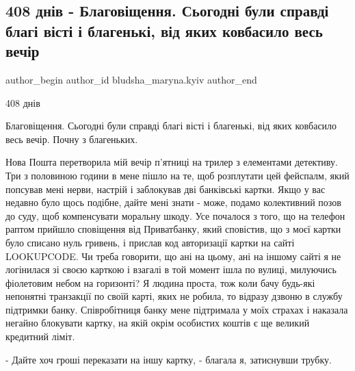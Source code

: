  
 
 
 
 

\subsection{408 днів - Благовіщення. Сьогодні були справді благі вісті і благенькі, від яких ковбасило весь вечір}
\label{sec:08_04_2023.fb.bludsha_maryna.kyiv.1.408_dniv_blagovischennja}

\ifcmt
 author_begin
   author_id bludsha_maryna.kyiv
 author_end
\fi

408 днів

Благовіщення. Сьогодні були справді благі вісті і благенькі, від яких ковбасило
весь вечір. Почну з благеньких.

Нова Пошта перетворила мій вечір п'ятниці на трилер з елементами детективу. Три
з половиною години в мене пішло на те, щоб розплутати цей фейспалм, який
попсував мені нерви, настрій і заблокував дві банківські картки. Якщо у вас
недавно було щось подібне, дайте мені знати - може, подамо колективний позов до
суду, щоб компенсувати моральну шкоду. Усе почалося з того, що на телефон
раптом прийшло сповіщення від Приватбанку, який сповістив, що з моєї картки
було списано нуль гривень, і прислав код авторизації картки на сайті
LOOKUPCODE. Чи треба говорити, що ані на цьому, ані на іншому сайті я не
логінилася зі своєю карткою і взагалі в той момент ішла по вулиці, милуючись
фіолетовим небом на горизонті? Я людина проста, тож коли бачу будь-які
непонятні транзакції по своїй карті, яких не робила, то відразу дзвоню в службу
підтримки банку. Співробітниця банку мене підтримала у моїх страхах і наказала
негайно блокувати картку, на якій окрім особистих коштів є ще великий кредитний
ліміт.

- Дайте хоч гроші переказати на іншу картку, - благала я, затиснувши трубку.

